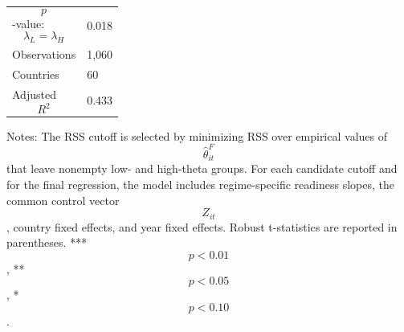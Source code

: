 \begin{table}[H]
\begin{threeparttable}
\begin{tabularx}{\textwidth}{lY}
$$p$$-value: $$\lambda_L=\lambda_H$$ & 0.018 \\
Observations & 1,060 \\
Countries & 60 \\
Adjusted $$R^2$$ & 0.433 \\
\bottomrule
\end{tabularx}
\begin{tablenotes}[flushleft]\footnotesize
\item Notes: The RSS cutoff is selected by minimizing RSS over empirical values of $$\widehat{\theta}^{F}_{it}$$ that leave nonempty low- and high-theta groups. For each candidate cutoff and for the final regression, the model includes regime-specific readiness slopes, the common control vector $$Z_{it}$$, country fixed effects, and year fixed effects. Robust t-statistics are reported in parentheses. *** $$p<0.01$$, ** $$p<0.05$$, * $$p<0.10$$.
\end{tablenotes}
\end{threeparttable}
\end{table}
